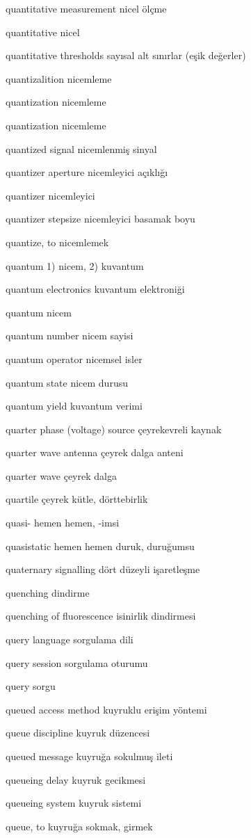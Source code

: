 \documentclass[12pt,fleqn]{article}\usepackage{../../common}
\begin{document}
quantitative measurement nicel ölçme

quantitative nicel

quantitative thresholds sayısal alt sınırlar (eşik değerler)

quantizalition nicemleme

quantization nicemleme

quantization nicemleme

quantized signal nicemlenmiş sinyal

quantizer aperture nicemleyici açıklığı

quantizer nicemleyici

quantizer stepsize nicemleyici basamak boyu

quantize, to nicemlemek

quantum 1) nicem, 2) kuvantum

quantum electronics kuvantum elektroniği

quantum nicem

quantum number nicem sayisi

quantum operator nicemsel isler

quantum state nicem durusu

quantum yield kuvantum verimi

quarter phase (voltage) source çeyrekevreli kaynak

quarter wave antenna çeyrek dalga anteni

quarter wave çeyrek dalga

quartile çeyrek kütle, dörttebirlik

quasi- hemen hemen, -imsi

quasistatic hemen hemen duruk, duruğumsu

quaternary signalling dört düzeyli işaretleşme

quenching dindirme

quenching of fluorescence isinirlik dindirmesi

query language sorgulama dili

query session sorgulama oturumu

query sorgu

queued access method kuyruklu erişim yöntemi

queue discipline kuyruk düzencesi

queued message kuyruğa sokulmuş ileti

queueing delay kuyruk gecikmesi

queueing system kuyruk sistemi

queue, to kuyruğa sokmak, girmek
\end{document}
